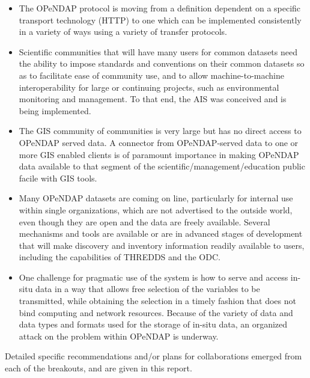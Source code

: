 \begin{itemize}
  
\item The \ac{OPeNDAP} protocol is moving from a definition dependent
  on a specific transport technology (HTTP) to one which can be
  implemented consistently in a variety of ways using a
  variety of transfer protocols.
  
\item Scientific communities that will have many users for common
  datasets need the ability to impose standards and conventions on
  their common datasets so as to facilitate ease of community use, and
  to allow machine-to-machine interoperability for large or continuing
  projects, such as environmental monitoring and management.  To that
  end, the \ac{AIS} was conceived and is being implemented.
  
\item The \ac{GIS} community of communities is very large but has no
  direct access to \ac{OPeNDAP} served data.  A connector from
  \ac{OPeNDAP}-served data to one or more \ac{GIS} enabled clients is
  of paramount importance in making \ac{OPeNDAP} data available to
  that segment of the scientific/management/education public facile
  with \ac{GIS} tools.
  
\item Many \ac{OPeNDAP} datasets are coming on line, particularly for
  internal use within single organizations, which are not advertised
  to the outside world, even though they are open and the data are
  freely available.  Several mechanisms and tools are available or are
  in advanced stages of development that will make discovery and
  inventory information readily available to users, including the
  capabilities of \ac{THREDDS} and the \ac{ODC}.
  
\item One challenge for pragmatic use of the system is how to serve
  and access in-situ data in a way that allows free selection of the
  variables to be transmitted, while obtaining the selection in a
  timely fashion that does not bind computing and network resources.
  Because of the variety of data and data types and formats used for
  the storage of in-situ data, an organized attack on the problem
  within \ac{OPeNDAP} is underway.

\end{itemize}

Detailed specific recommendations and/or plans for collaborations
emerged from each of the breakouts, and are given in this report.


